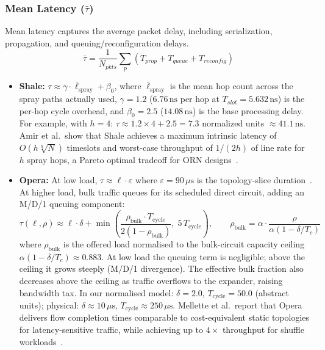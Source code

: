 \documentclass{article}
\begin{document}
    \subsubsection{Mean Latency ($\bar{\tau}$)}
    Mean latency captures the average packet delay, including serialization, propagation, and queuing/reconfiguration delays.
    \begin{equation}
        \bar{\tau} = \frac{1}{N_{pkts}} \sum_{p} (T_{prop} + T_{queue} + T_{reconfig})
    \end{equation}
    \begin{itemize}
        \item \textbf{Shale:} $\tau \approx \gamma \cdot \bar{\ell}_{\text{spray}} + \beta_0$, where $\bar{\ell}_{\text{spray}}$ is the mean hop count across the spray paths actually used, $\gamma = 1.2$ ($6.76\,\text{ns}$ per hop at $T_{slot} = 5.632\,\text{ns}$) is the per-hop cycle overhead, and $\beta_0 = 2.5$ ($14.08\,\text{ns}$) is the base processing delay. For example, with $h=4$: $\tau \approx 1.2 \times 4 + 2.5 = 7.3$ normalized units $\approx 41.1\,\text{ns}$. Amir et al.\ show that Shale achieves a maximum intrinsic latency of $O(h\sqrt[h]{N})$ timeslots and worst-case throughput of $1/(2h)$ of line rate for $h$ spray hops, a Pareto optimal tradeoff for ORN designs~\cite{shale}.
        \item \textbf{Opera:} At low load, $\tau \approx \ell \cdot \varepsilon$ where $\varepsilon = 90\,\mu\text{s}$ is the topology-slice duration~\cite{opera}. At higher load, bulk traffic queues for its scheduled direct circuit, adding an M/D/1 queuing component:
        \[
            \tau(\ell, \rho) \approx \ell \cdot \delta + \min\!\left(\frac{\rho_{\text{bulk}} \cdot T_{\text{cycle}}}{2(1-\rho_{\text{bulk}})},\; 5\,T_{\text{cycle}}\right),
            \qquad \rho_{\text{bulk}} = \alpha \cdot \frac{\rho}{\alpha(1-\delta/T_c)}
        \]
        where $\rho_{\text{bulk}}$ is the offered load normalised to the bulk-circuit capacity ceiling $\alpha(1-\delta/T_c) \approx 0.883$.  At low load the queuing term is negligible; above the ceiling it grows steeply (M/D/1 divergence).  The effective bulk fraction also decreases above the ceiling as traffic overflows to the expander, raising bandwidth tax.  In our normalised model: $\delta = 2.0$, $T_{\text{cycle}} = 50.0$ (abstract units); physical: $\delta \approx 10\,\mu\text{s}$, $T_{\text{cycle}} \approx 250\,\mu\text{s}$.  Mellette et al.\ report that Opera delivers flow completion times comparable to cost-equivalent static topologies for latency-sensitive traffic, while achieving up to $4\times$ throughput for shuffle workloads~\cite{opera}.

\end{itemize}
\end{document}
